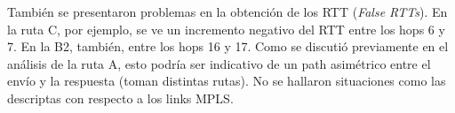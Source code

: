 También se presentaron problemas en la obtención de los RTT (\emph{False
RTTs}). En la ruta C, por ejemplo, se ve un incremento negativo del RTT entre
los hops 6 y 7. En la B2, también, entre los hops 16 y 17. Como se discutió
previamente en el análisis de la ruta A, esto podría ser indicativo de un path
asimétrico entre el envío y la respuesta (toman distintas rutas). No se
hallaron situaciones como las descriptas con respecto a los links MPLS.
